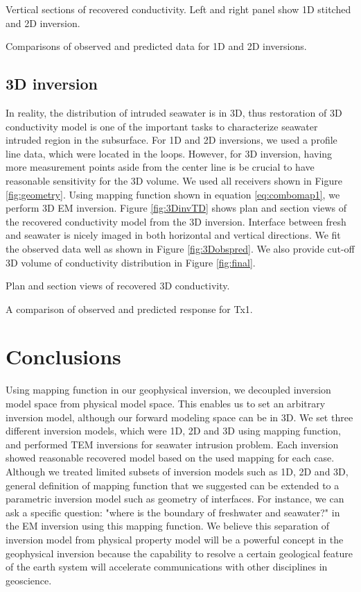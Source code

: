 \documentclass{segabs}
\begin{document}
{Vertical sections of recovered conductivity. Left and right panel show 1D stitched and 2D inversion.}

{Comparisons of observed and predicted data for 1D and 2D inversions. }

\subsection*{3D inversion}
In reality, the distribution of intruded seawater is in 3D, thus restoration of 3D conductivity model is one of the important tasks to characterize seawater intruded region in the subsurface. For 1D and 2D inversions, we used a profile line data, which were located in the loops. However, for 3D inversion, having more measurement points aside from the center line is be crucial to have reasonable sensitivity for the 3D volume. We used all receivers shown in Figure \ref{fig:geometry}. Using mapping function shown in equation \ref{eq:combomap1}, we perform 3D EM inversion. Figure \ref{fig:3DinvTD} shows plan and section views of the recovered conductivity model from the 3D inversion. Interface between fresh and seawater is nicely imaged in both horizontal and vertical directions. We fit the observed data well as shown in Figure \ref{fig:3Dobspred}. We also provide cut-off 3D volume of conductivity distribution in Figure \ref{fig:final}.

{Plan and section views of recovered 3D conductivity.}

{A comparison of observed and predicted response for Tx1.}

\section*{Conclusions}
Using mapping function in our geophysical inversion, we decoupled inversion model space from physical model space. This enables us to set an arbitrary inversion model, although our forward modeling space can be in 3D. We set three different inversion models, which were 1D, 2D and 3D using mapping function, and performed TEM inversions for seawater intrusion problem. Each inversion showed reasonable recovered model based on the used mapping for each case. Although we treated limited subsets of inversion models such as 1D, 2D and 3D, general definition of mapping function that we suggested can be extended to a parametric inversion model such as geometry of interfaces. For instance, we can ask a specific question: "where is the boundary of freshwater and seawater?" in the EM inversion using this mapping function. We believe this separation of inversion model from physical property model will be a powerful concept in the geophysical inversion because the capability to resolve a certain geological feature of the earth system  will accelerate communications with other disciplines in geoscience.
\end{document}
